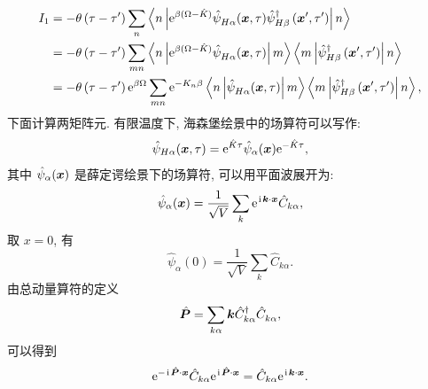 \begin{align}
I_1 & =-\theta\left(\tau-\tau^{\prime}\right) \sum_n\left\langle n\left|\mathrm{e}^{\beta(\Omega-\hat{K})} \hat{\psi}^{}_{H \alpha}(\boldsymbol{x}, \tau) \hat{\psi}_{H\beta}^{\dagger}\left(\boldsymbol{x}^{\prime}, \tau^{\prime}\right)\right| n\right\rangle \nonumber\\
& =-\theta\left(\tau-\tau^{\prime}\right) \sum_{m n}\left\langle n\left|\mathrm{e}^{\beta(\Omega-\hat{K})} \hat{\psi}^{}_{H \alpha}(\boldsymbol{x}, \tau)\right| m\right\rangle\left\langle m\left|\hat{\psi}_{H \beta}^{\dagger}\left(\boldsymbol{x}^{\prime}, \tau^{\prime}\right)\right| n\right\rangle \nonumber\\
& =-\theta\left(\tau-\tau^{\prime}\right) \mathrm{e}^{\beta \Omega} \sum_{m n} \mathrm{e}^{-K_n \beta}\left\langle n\left| \hat{\psi}^{}_{H \alpha}(\boldsymbol{x}, \tau)\right| m\right\rangle\left\langle m\left|\hat{\psi}_{H \beta}^{\dagger}\left(\boldsymbol{x}^{\prime}, \tau^{\prime}\right)\right| n\right\rangle ,
\end{align}
下面计算两矩阵元. 有限温度下, 海森堡绘景中的场算符可以写作:
\begin{equation}
\hat{\psi}_{H \alpha}(\boldsymbol{x}, \tau)=\mathrm{e}^{\hat{K} \tau} \hat{\psi}_\alpha(\boldsymbol{x}) \mathrm{e}^{-\hat{K} \tau}, 
\end{equation}
其中 $\hat{\psi}_\alpha(\boldsymbol{x})$ 是薛定谔绘景下的场算符, 可以用平面波展开为:
\begin{equation}
\hat{\psi}_\alpha(\boldsymbol{x})=\frac{1}{\sqrt{V}} \sum_k \mathrm{e}^{\hspace{0.1em}\mathrm{i}\hspace{0.1em} \boldsymbol{k} \cdot \boldsymbol{x}} \hat{C}_{k \alpha}, 
\end{equation}
取 $x=0$, 有
\begin{equation}
\hat{\psi}_\alpha(0)=\frac{1}{\sqrt{V}} \sum_k  \hat{C}_{k \alpha}.
\end{equation}
由总动量算符的定义
\begin{equation}
\hat{\boldsymbol{P}}  =\sum_{k \alpha} \boldsymbol{k} \hat{C}_{k \alpha}^{\dagger} \hat{C}^{}_{k \alpha} ,
\end{equation}
可以得到
\begin{equation}
 \mathrm{e}^{-\hspace{0.1em}\mathrm{i}\hspace{0.1em} \hat{\boldsymbol{P}} \cdot \boldsymbol{x}} \hat{C}_{k \alpha} \mathrm{e}^{\hspace{0.1em}\mathrm{i}\hspace{0.1em} \hat{\boldsymbol{P}} \cdot \boldsymbol{x}}=\hat{C}_{k \alpha} \mathrm{e}^{\hspace{0.1em}\mathrm{i}\hspace{0.1em} \boldsymbol{k} \cdot \boldsymbol{x}} .
\end{equation}
